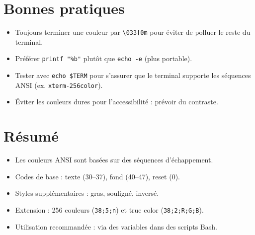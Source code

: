 \documentclass[11pt,a4paper]{article}
\begin{document}
\section{Bonnes pratiques}
\begin{itemize}
  \item Toujours terminer une couleur par \verb|\033[0m| pour éviter de polluer le reste du terminal.
  \item Préférer \verb|printf "%b"| plutôt que \verb|echo -e| (plus portable).
  \item Tester avec \verb|echo $TERM| pour s’assurer que le terminal supporte les séquences ANSI (ex. \texttt{xterm-256color}).
  \item Éviter les couleurs dures pour l’accessibilité : prévoir du contraste.
\end{itemize}

\section*{Résumé}
\begin{itemize}
  \item Les couleurs ANSI sont basées sur des séquences d’échappement.
  \item Codes de base : texte (30--37), fond (40--47), reset (0).
  \item Styles supplémentaires : gras, souligné, inversé.
  \item Extension : 256 couleurs (\verb|38;5;n|) et true color (\verb|38;2;R;G;B|).
  \item Utilisation recommandée : via des variables dans des scripts Bash.
\end{itemize}
\end{document}
